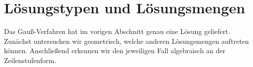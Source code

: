 \section{Lösungstypen und Lösungsmengen}
\label{sec:linear_systems_solution_sets}

Das Gauß-Verfahren hat im vorigen Abschnitt genau eine Lösung geliefert.
Zunächst untersuchen wir geometrisch, welche anderen Lösungsmengen auftreten
können. Anschließend erkennen wir den jeweiligen Fall algebraisch an der
Zeilenstufenform.





